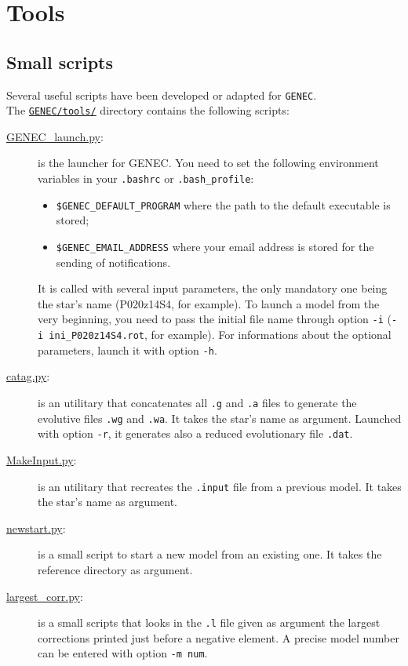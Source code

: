 \documentclass[11pt]{article}
\begin{document}
\section{Tools\label{tools}}
\subsection{Small scripts}
Several useful scripts have been developed or adapted for {\tt GENEC}.\\

The \href{https://github.com/GESEG/GENEC/tree/develop/tools}{\tt GENEC/tools/} directory contains the following scripts:
\begin{description}
\item[\underline{GENEC\_launch.py}:] is the launcher for GENEC. You need to set the following environment variables in your \verb?.bashrc? or \verb?.bash_profile?:
      \begin{itemize}
         \item \verb?$GENEC_DEFAULT_PROGRAM? where the path to the default executable is stored;
         \item \verb?$GENEC_EMAIL_ADDRESS? where your email address is stored for the sending of notifications.
       \end{itemize}
         It is called with several input parameters, the only mandatory one being the star's name (P020z14S4, for example). To launch a model from the very beginning, you need to pass the initial file name through option \verb?-i? (\verb?-i ini_P020z14S4.rot?, for example). For informations about the optional parameters, launch it with option \verb?-h?.
\item[\underline{catag.py}:] is an utilitary that concatenates all {\tt .g} and {\tt .a} files to generate the evolutive files {\tt .wg} and {\tt .wa}. It takes the star's name as argument. Launched with option \verb?-r?, it generates also a reduced evolutionary file {\tt .dat}.
\item[\underline{MakeInput.py}:] is an utilitary that recreates the {\tt .input} file from a previous model. It takes the star's name as argument.
\item[\underline{newstart.py}:] is a small script to start a new model from an existing one. It takes the reference directory as argument.
\item[\underline{largest\_corr.py}:] is a small scripts that looks in the {\tt .l} file given as argument the largest corrections printed just before a negative element. A precise model number can be entered with option \verb?-m num?.

\end{description}
\end{document}
